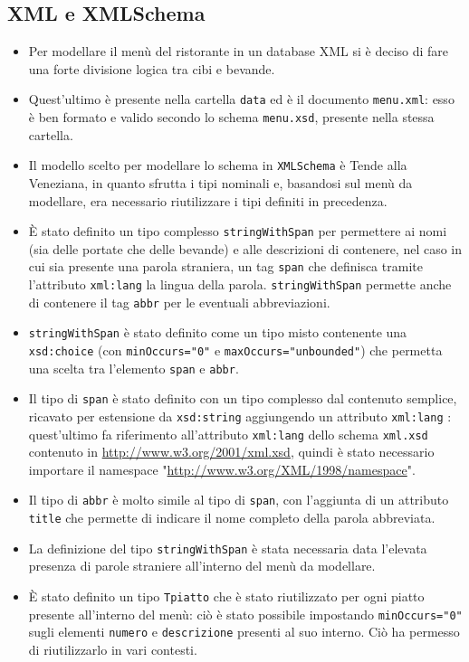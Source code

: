 \documentclass[../relazione.tex]{subfiles}
\begin{document}
	\subsection{XML e XMLSchema}
	\begin{itemize}
		\item Per modellare il menù del ristorante in un database XML si è deciso di fare una forte divisione logica tra cibi e bevande.
		\item Quest'ultimo è presente nella cartella \texttt{data} ed è il documento \texttt{menu.xml}: esso è ben formato e valido secondo lo schema \texttt{menu.xsd}, presente nella stessa cartella.
		\item Il modello scelto per modellare lo schema in \texttt{XMLSchema} è Tende alla Veneziana, in quanto sfrutta i tipi nominali e, basandosi sul menù da modellare, era necessario riutilizzare i tipi definiti in precedenza. 
		\item È stato definito un tipo complesso \texttt{stringWithSpan} per permettere ai nomi (sia delle portate che delle bevande) e alle descrizioni di contenere, nel caso in cui sia presente una parola straniera, un tag \texttt{span} che definisca tramite l'attributo \texttt{xml:lang} la lingua della parola. \texttt{stringWithSpan} permette anche di contenere il tag \texttt{abbr} per le eventuali abbreviazioni.
		\item \texttt{stringWithSpan} è stato definito come un tipo misto contenente una \texttt{xsd:choice} (con \texttt{minOccurs="0"} e \texttt{maxOccurs="unbounded"}) che permetta una scelta tra l'elemento \texttt{span} e \texttt{abbr}.
		\item Il tipo di \texttt{span} è stato definito con un tipo complesso dal contenuto semplice, ricavato per estensione da \texttt{xsd:string} aggiungendo un attributo \texttt{xml:lang} : quest'ultimo fa riferimento all'attributo \texttt{xml:lang} dello schema \texttt{xml.xsd} contenuto in \url{http://www.w3.org/2001/xml.xsd}, quindi è stato necessario importare il namespace "\url{http://www.w3.org/XML/1998/namespace}".
		\item Il tipo di \texttt{abbr} è molto simile al tipo di \texttt{span}, con l'aggiunta di un attributo \texttt{title} che permette di indicare il nome completo della parola abbreviata.
		\item La definizione del tipo \texttt{stringWithSpan} è stata necessaria data l'elevata presenza di parole straniere all'interno del menù da modellare.
		\item È stato definito un tipo \texttt{Tpiatto} che è stato riutilizzato per ogni piatto presente all'interno del menù: ciò è stato possibile impostando \texttt{minOccurs="0"} sugli elementi \texttt{numero} e \texttt{descrizione} presenti al suo interno. Ciò ha permesso di riutilizzarlo in vari contesti.

\end{itemize}
\end{document}
